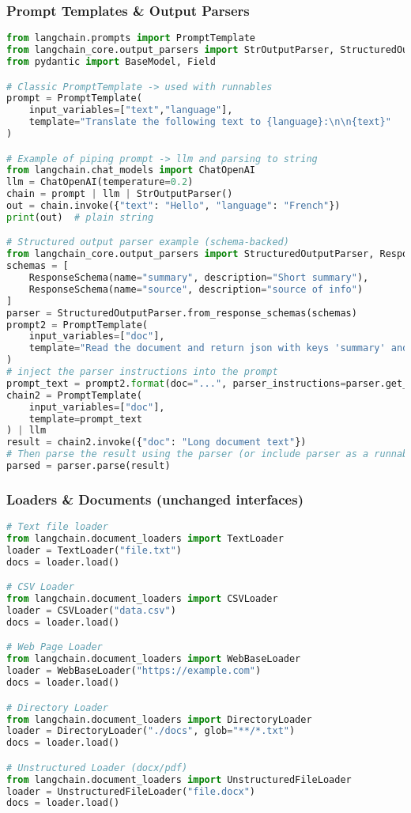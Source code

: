 \begin{frame}[fragile]\frametitle{Prompt Templates \& Output Parsers}
\begin{lstlisting}[language=python,basicstyle=\tiny]
from langchain.prompts import PromptTemplate
from langchain_core.output_parsers import StrOutputParser, StructuredOutputParser
from pydantic import BaseModel, Field

# Classic PromptTemplate -> used with runnables
prompt = PromptTemplate(
    input_variables=["text","language"],
    template="Translate the following text to {language}:\n\n{text}"
)

# Example of piping prompt -> llm and parsing to string
from langchain.chat_models import ChatOpenAI
llm = ChatOpenAI(temperature=0.2)
chain = prompt | llm | StrOutputParser()
out = chain.invoke({"text": "Hello", "language": "French"})
print(out)  # plain string

# Structured output parser example (schema-backed)
from langchain_core.output_parsers import StructuredOutputParser, ResponseSchema
schemas = [
    ResponseSchema(name="summary", description="Short summary"),
    ResponseSchema(name="source", description="source of info")
]
parser = StructuredOutputParser.from_response_schemas(schemas)
prompt2 = PromptTemplate(
    input_variables=["doc"],
    template="Read the document and return json with keys 'summary' and 'source'.\n\n{doc}\n\n{parser_instructions}"
)
# inject the parser instructions into the prompt
prompt_text = prompt2.format(doc="...", parser_instructions=parser.get_format_instructions())
chain2 = PromptTemplate(
    input_variables=["doc"],
    template=prompt_text
) | llm
result = chain2.invoke({"doc": "Long document text"})
# Then parse the result using the parser (or include parser as a runnable)
parsed = parser.parse(result)
\end{lstlisting}
\end{frame}

\begin{frame}[fragile]\frametitle{Loaders \& Documents (unchanged interfaces)}
\begin{lstlisting}[language=python,basicstyle=\tiny]
# Text file loader
from langchain.document_loaders import TextLoader
loader = TextLoader("file.txt")
docs = loader.load()

# CSV Loader
from langchain.document_loaders import CSVLoader
loader = CSVLoader("data.csv")
docs = loader.load()

# Web Page Loader
from langchain.document_loaders import WebBaseLoader
loader = WebBaseLoader("https://example.com")
docs = loader.load()

# Directory Loader
from langchain.document_loaders import DirectoryLoader
loader = DirectoryLoader("./docs", glob="**/*.txt")
docs = loader.load()

# Unstructured Loader (docx/pdf)
from langchain.document_loaders import UnstructuredFileLoader
loader = UnstructuredFileLoader("file.docx")
docs = loader.load()
\end{lstlisting}
\end{frame}

